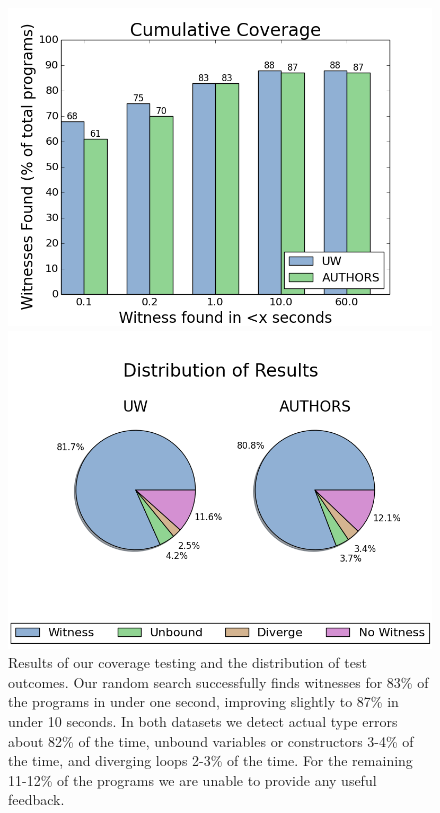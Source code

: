 \begin{figure}[t]
\centering
\begin{minipage}{\linewidth}
\includegraphics[width=\linewidth]{coverage.png}
\end{minipage}
\begin{minipage}{\linewidth}
\includegraphics[width=\linewidth]{distrib.png}
\end{minipage}
\caption{Results of our coverage testing and the distribution of test
  outcomes. Our random search successfully finds witnesses for 83\% of
  the programs in under one second, improving slightly to 87\% in under
  10 seconds. In both datasets we detect actual type errors about 82\%
  of the time, unbound variables or constructors 3-4\% of the time, and
  diverging loops 2-3\% of the time. For the remaining 11-12\% of the
  programs we are unable to provide any useful feedback.  }
\label{fig:results-witness}
\end{figure}

